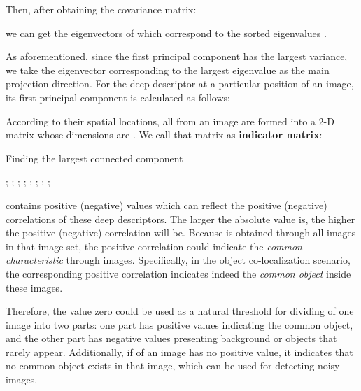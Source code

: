 \documentclass[twocolumn]{svjour3}          \smartqed  \usepackage{graphicx}
\begin{document}
Then, after obtaining the covariance matrix:

we can get the eigenvectors  of  which correspond to the sorted eigenvalues .

As aforementioned, since the first principal component has the largest variance, we take the eigenvector  corresponding to the largest eigenvalue as the main projection direction. For the deep descriptor at a particular position  of an image, its first principal component  is calculated as follows:

According to their spatial locations, all  from an image are formed into a 2-D matrix whose dimensions are . We call that matrix as \textbf{{indicator matrix}}:


\begin{algorithm}[t]
\caption{Finding the largest connected component}
\label{algo:bwconn}
\begin{algorithmic}[1]{
;
;
;
;
;
\ENDIF
{};
\ENDWHILE
{};
;
}\end{algorithmic}
\end{algorithm}

 contains positive (negative) values which can reflect the positive (negative) correlations of these deep descriptors. The larger the absolute value is, the higher the positive (negative) correlation will be. Because  is obtained through all  images in that image set, the positive correlation could indicate the \emph{common characteristic} through  images. Specifically, in the object co-localization scenario, the corresponding positive correlation indicates indeed the \emph{common object} inside these images.

Therefore, the value zero could be used as a natural threshold for dividing  of one image into two parts: one part has positive values indicating the common object, and the other part has negative values presenting background or objects that rarely appear. Additionally, if  of an image has no positive value, it indicates that no common object exists in that image, which can be used for detecting noisy images.
\end{document}
